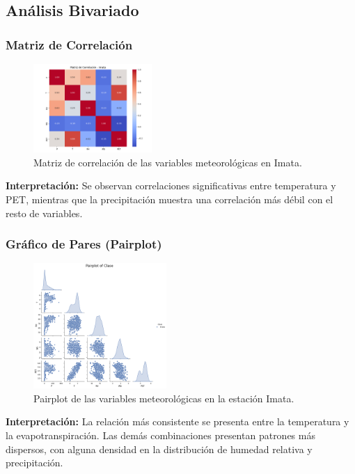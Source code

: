 \subsection{Análisis Bivariado}

\subsubsection*{Matriz de Correlación}
\begin{figure}[H]
\centering
\includegraphics[width=0.4\textwidth]{resultados/por_estacion_meteorologica/Imata/matriz_correlacion.png}
\caption{Matriz de correlación de las variables meteorológicas en Imata.}
\label{fig:imata_corr}
\end{figure}
\textbf{Interpretación:} Se observan correlaciones significativas entre temperatura y PET, mientras que la precipitación muestra una correlación más débil con el resto de variables.

\subsubsection*{Gráfico de Pares (Pairplot)}
\begin{figure}[H]
\centering
\includegraphics[width=0.45\textwidth]{resultados/por_estacion_meteorologica/Imata/pairplot.png}
\caption{Pairplot de las variables meteorológicas en la estación Imata.}
\label{fig:imata_pairplot}
\end{figure}
\textbf{Interpretación:} La relación más consistente se presenta entre la temperatura y la evapotranspiración. Las demás combinaciones presentan patrones más dispersos, con alguna densidad en la distribución de humedad relativa y precipitación.


